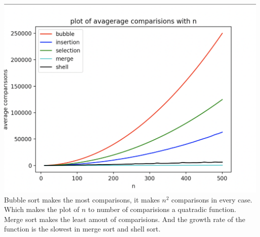 \documentclass[a4paper]{exam}
\begin{document}
\begin{questions}
	\begin{solution}
		\\\includegraphics[scale =  0.5]{plot_(10,501,10).png}
		\\Bubble sort makes the most comparisons, it makes $n^2$ comparisons in every case. 
		Which makes the plot of $n$ to number of comparisions a quatradic function.
		\\Merge sort makes the least amout of comparisions. And the growth rate of the function is the slowest in merge sort and shell sort.
	\end{solution}

\end{questions}
\end{document}
